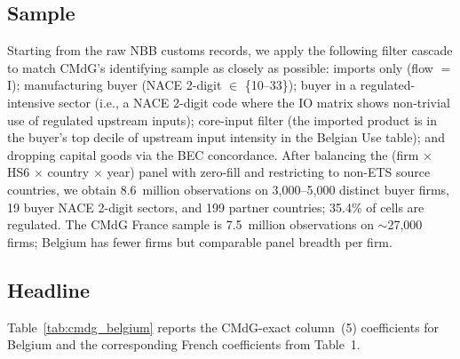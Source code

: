 \subsection{Sample}\label{sec:across:sample}

Starting from the raw NBB customs records, we apply the following filter cascade to match CMdG's identifying sample as closely as possible: imports only (flow $=$ I); manufacturing buyer (NACE 2-digit $\in$ \{10--33\}); buyer in a regulated-intensive sector (i.e., a NACE 2-digit code where the IO matrix shows non-trivial use of regulated upstream inputs); core-input filter (the imported product is in the buyer's top decile of upstream input intensity in the Belgian Use table); and dropping capital goods via the BEC concordance. After balancing the (firm $\times$ HS6 $\times$ country $\times$ year) panel with zero-fill and restricting to non-ETS source countries, we obtain 8.6~million observations on 3{,}000--5{,}000 distinct buyer firms, 19 buyer NACE 2-digit sectors, and 199 partner countries; 35.4\% of cells are regulated. The CMdG France sample is 7.5~million observations on $\sim$27{,}000 firms; Belgium has fewer firms but comparable panel breadth per firm.

\subsection{Headline}\label{sec:across:headline}

Table~\ref{tab:cmdg_belgium} reports the CMdG-exact column~(5) coefficients for Belgium and the corresponding French coefficients from \citet{CosterMejeanDiGiovanni2024} Table~1.

